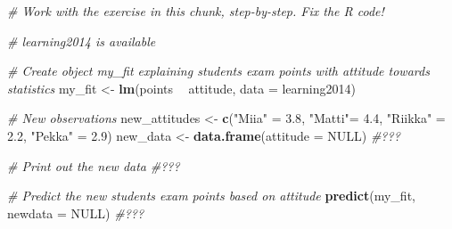 \documentclass[]{article}
\newenvironment{Shaded}{\begin{snugshade}}{\end{snugshade}}
\newcommand{\CommentTok}[1]{\textcolor[rgb]{0.56,0.35,0.01}{\textit{#1}}}
\newcommand{\DataTypeTok}[1]{\textcolor[rgb]{0.13,0.29,0.53}{#1}}
\newcommand{\FloatTok}[1]{\textcolor[rgb]{0.00,0.00,0.81}{#1}}
\newcommand{\KeywordTok}[1]{\textcolor[rgb]{0.13,0.29,0.53}{\textbf{#1}}}
\newcommand{\NormalTok}[1]{#1}
\newcommand{\OperatorTok}[1]{\textcolor[rgb]{0.81,0.36,0.00}{\textbf{#1}}}
\newcommand{\OtherTok}[1]{\textcolor[rgb]{0.56,0.35,0.01}{#1}}
\newcommand{\StringTok}[1]{\textcolor[rgb]{0.31,0.60,0.02}{#1}}
\begin{document}
\begin{Shaded}
\begin{Highlighting}[]
\CommentTok{# Work with the exercise in this chunk, step-by-step. Fix the R code!}

\CommentTok{# learning2014 is available}

\CommentTok{# Create object my_fit explaining students exam points with attitude towards statistics}
\NormalTok{my_fit <-}\StringTok{ }\KeywordTok{lm}\NormalTok{(points }\OperatorTok{~}\StringTok{ }\NormalTok{attitude, }\DataTypeTok{data =}\NormalTok{ learning2014)}

\CommentTok{# New observations}
\NormalTok{new_attitudes <-}\StringTok{ }\KeywordTok{c}\NormalTok{(}\StringTok{"Miia"}\NormalTok{ =}\StringTok{ }\FloatTok{3.8}\NormalTok{, }\StringTok{"Matti"}\NormalTok{=}\StringTok{ }\FloatTok{4.4}\NormalTok{, }\StringTok{"Riikka"}\NormalTok{ =}\StringTok{ }\FloatTok{2.2}\NormalTok{, }\StringTok{"Pekka"}\NormalTok{ =}\StringTok{ }\FloatTok{2.9}\NormalTok{)}
\NormalTok{new_data <-}\StringTok{ }\KeywordTok{data.frame}\NormalTok{(}\DataTypeTok{attitude =} \OtherTok{NULL}\NormalTok{) }\CommentTok{#???}

\CommentTok{# Print out the new data}
\CommentTok{#???}

\CommentTok{# Predict the new students exam points based on attitude}
\KeywordTok{predict}\NormalTok{(my_fit, }\DataTypeTok{newdata =} \OtherTok{NULL}\NormalTok{) }\CommentTok{#???}
\end{Highlighting}
\end{Shaded}
\end{document}
